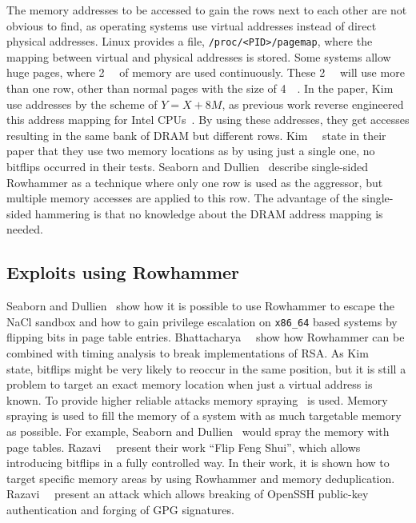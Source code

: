 The memory addresses to be accessed to gain the rows next to each other are not
obvious to find, as operating systems use virtual addresses instead of direct
physical addresses. Linux provides a file, \texttt{/proc/<PID>/pagemap}, where
the mapping between virtual and physical addresses is stored. Some systems allow
huge pages, where \SI{2}{\mega\byte} of memory are used continuously. These
\SI{2}{\mega\byte} will use more than one row, other than normal pages with the
size of \SI{4}{\kilo\byte}. In the paper, Kim~\etal~\cite{rowhammergeneral} use
addresses by the scheme of $Y = X+8M$, as previous work reverse engineered this
address mapping for Intel CPUs~\cite{reversemap1, reversemap2}. By using these
addresses, they get accesses resulting in the same bank of DRAM but different
rows. Kim~\etal~\cite{rowhammergeneral} state in their paper that they use two
memory locations as by using just a single one, no bitflips occurred in their
tests. Seaborn and Dullien~\cite{blackhatrow} describe single-sided Rowhammer as
a technique where only one row is used as the aggressor, but multiple memory
accesses are applied to this row. The advantage of the single-sided hammering is
that no knowledge about the DRAM address mapping is needed.

\subsection{Exploits using Rowhammer}

Seaborn and Dullien~\cite{projectzerorow} show how it is possible to use
Rowhammer to escape the NaCl sandbox and how to gain privilege escalation on
\texttt{x86\_64} based systems by flipping bits in page table entries.
Bhattacharya~\etal~\cite{rowhammerrsa} show how Rowhammer can be combined with
timing analysis to break implementations of RSA. As
Kim~\etal~\cite{rowhammergeneral} state, bitflips might be very likely to
reoccur in the same position, but it is still a problem to target an exact
memory location when just a virtual address is known. To provide higher reliable
attacks memory spraying~\cite{projectzerorow, rowhammerjs, rowhammercloud} is
used. Memory spraying is used to fill the memory of a system with as much
targetable memory as possible. For example, Seaborn and
Dullien~\cite{projectzerorow} would spray the memory with page tables.
Razavi~\etal~\cite{flipfeng} present their work ``Flip Feng Shui'', which allows
introducing bitflips in a fully controlled way. In their work, it is shown how
to target specific memory areas by using Rowhammer and memory deduplication.
Razavi~\etal~\cite{flipfeng} present an attack which allows breaking of OpenSSH
public-key authentication and forging of GPG signatures.

